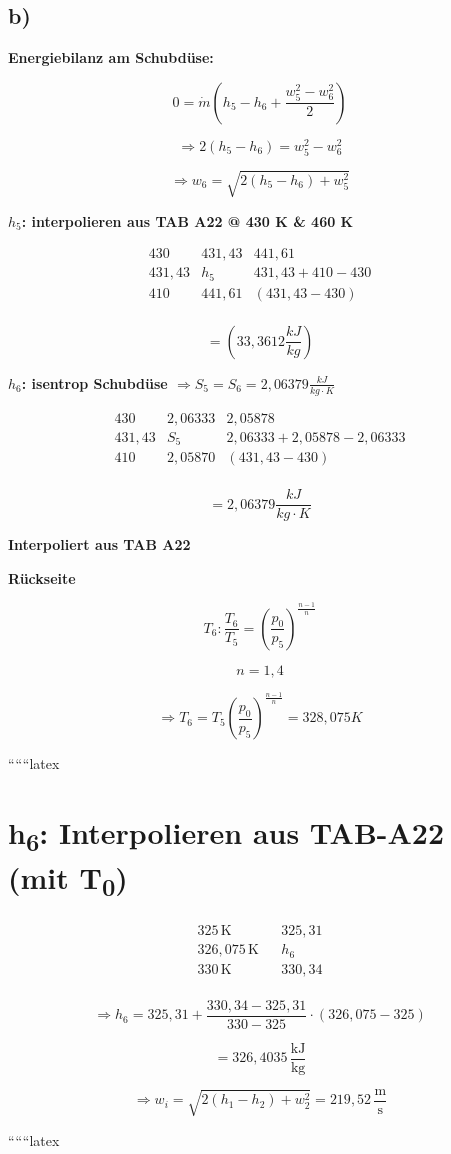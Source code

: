 

\subsection*{b)}

\textbf{Energiebilanz am Schubdüse:}

\[
0 = \dot{m} \left( h_5 - h_6 + \frac{w_5^2 - w_6^2}{2} \right)
\]

\[
\Rightarrow 2(h_5 - h_6) = w_5^2 - w_6^2
\]

\[
\Rightarrow w_6 = \sqrt{2(h_5 - h_6) + w_5^2}
\]

\textbf{$h_5$: interpolieren aus TAB A22 @ 430 K \& 460 K}

\[
\begin{array}{ccc}
430 & 431,43 & 441,61 \\
431,43 & h_5 & 431,43 + 410 - 430 \\
410 & 441,61 & (431,43 - 430) \\
\end{array}
\]

\[
= (33,3612 \frac{kJ}{kg})
\]

\textbf{$h_6$: isentrop Schubdüse $\Rightarrow S_5 = S_6 = 2,06379 \frac{kJ}{kg \cdot K}$}

\[
\begin{array}{ccc}
430 & 2,06333 & 2,05878 \\
431,43 & S_5 & 2,06333 + 2,05878 - 2,06333 \\
410 & 2,05870 & (431,43 - 430) \\
\end{array}
\]

\[
= 2,06379 \frac{kJ}{kg \cdot K}
\]

\textbf{Interpoliert aus TAB A22}

\textbf{Rückseite}

\[
T_6: \frac{T_6}{T_5} = \left( \frac{p_0}{p_5} \right)^{\frac{n-1}{n}}
\]

\[
n = 1,4
\]

\[
\Rightarrow T_6 = T_5 \left( \frac{p_0}{p_5} \right)^{\frac{n-1}{n}} = 328,075 K
\]

``````latex


\section*{h\textsubscript{6}: Interpolieren aus TAB-A22 (mit T\textsubscript{0})}

\[
\begin{array}{cccc}
325 \, \text{K} & & 325,31 \\
326,075 \, \text{K} & & h_6 \\
330 \, \text{K} & & 330,34 \\
\end{array}
\]

\[
\Rightarrow h_6 = 325,31 + \frac{330,34 - 325,31}{330 - 325} \cdot (326,075 - 325)
\]

\[
= 326,4035 \, \frac{\text{kJ}}{\text{kg}}
\]

\[
\Rightarrow w_i = \sqrt{2(h_1 - h_2) + w_2^2} = 219,52 \, \frac{\text{m}}{\text{s}}
\]

``````latex